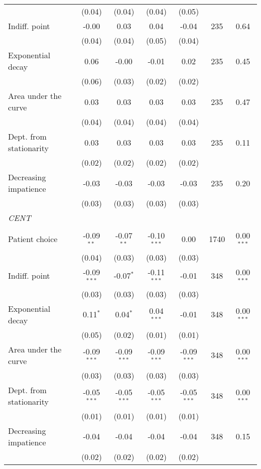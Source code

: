{\begin{tabular}{l*{6}{c}}
          &   (0.04)&   (0.04)&   (0.04)&   (0.05)&         &         \\
Indiff. point&    -0.00&     0.03&     0.04&    -0.04&      235&     0.64\\
          &   (0.04)&   (0.04)&   (0.05)&   (0.04)&         &         \\
Exponential decay&     0.06&    -0.00&    -0.01&     0.02&      235&     0.45\\
          &   (0.06)&   (0.03)&   (0.02)&   (0.02)&         &         \\
Area under the curve&     0.03&     0.03&     0.03&     0.03&      235&     0.47\\
          &   (0.04)&   (0.04)&   (0.04)&   (0.04)&         &         \\
Dept. from stationarity&     0.03&     0.03&     0.03&     0.03&      235&     0.11\\
          &   (0.02)&   (0.02)&   (0.02)&   (0.02)&         &         \\
Decreasing impatience&    -0.03&    -0.03&    -0.03&    -0.03&      235&     0.20\\
          &   (0.03)&   (0.03)&   (0.03)&   (0.03)&         &         \\
\textit{CENT}&         &         &         &         &         &         \\
          &         &         &         &         &         &         \\
Patient choice&-0.09$^{**}$&-0.07$^{**}$&-0.10$^{***}$&     0.00&     1740&0.00$^{***}$\\
          &   (0.04)&   (0.03)&   (0.03)&   (0.03)&         &         \\
Indiff. point&-0.09$^{***}$&-0.07$^{*}$&-0.11$^{***}$&    -0.01&      348&0.00$^{***}$\\
          &   (0.03)&   (0.03)&   (0.03)&   (0.03)&         &         \\
Exponential decay&0.11$^{*}$&0.04$^{*}$&0.04$^{***}$&    -0.01&      348&0.00$^{***}$\\
          &   (0.05)&   (0.02)&   (0.01)&   (0.01)&         &         \\
Area under the curve&-0.09$^{***}$&-0.09$^{***}$&-0.09$^{***}$&-0.09$^{***}$&      348&0.00$^{***}$\\
          &   (0.03)&   (0.03)&   (0.03)&   (0.03)&         &         \\
Dept. from stationarity&-0.05$^{***}$&-0.05$^{***}$&-0.05$^{***}$&-0.05$^{***}$&      348&0.00$^{***}$\\
          &   (0.01)&   (0.01)&   (0.01)&   (0.01)&         &         \\
Decreasing impatience&    -0.04&    -0.04&    -0.04&    -0.04&      348&     0.15\\
          &   (0.02)&   (0.02)&   (0.02)&   (0.02)&         &         \\
\bottomrule
\end{tabular}
}

